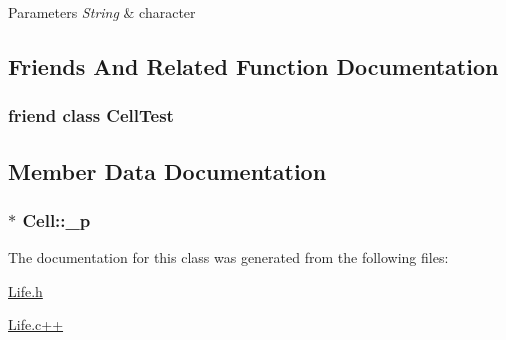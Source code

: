 \begin{DoxyParams}{Parameters}
{\em String} & character \\
\hline
\end{DoxyParams}


\subsection{Friends And Related Function Documentation}
\hypertarget{classCell_a4a8fb13b6ff304aefc7aa29538062941}{
\subsubsection[{Cell\-Test}]{\setlength{\rightskip}{0pt plus 5cm}friend class Cell\-Test\hspace{0.3cm}{\ttfamily [friend]}}}\label{classCell_a4a8fb13b6ff304aefc7aa29538062941}


\subsection{Member Data Documentation}
\hypertarget{classCell_af8bb6306c15463d257e4775095b2f273}{
\subsubsection[{\-\_\-p}]{$\ast$ Cell\-::\-\_\-p\hspace{0.3cm}{\ttfamily [private]}}}\label{classCell_af8bb6306c15463d257e4775095b2f273}


The documentation for this class was generated from the following files\-:\begin{DoxyCompactItemize}
\item 
\hyperlink{Life_8h}{Life.\-h}\item 
\hyperlink{Life_8c_09_09}{Life.\-c++}\end{DoxyCompactItemize}

